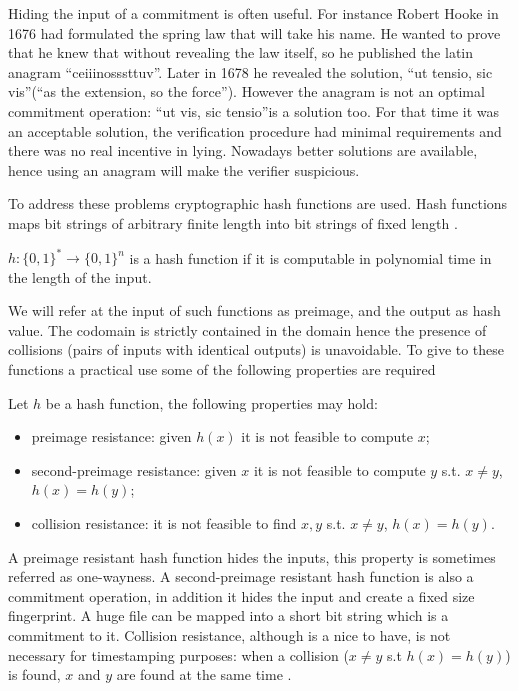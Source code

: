 Hiding the input of a commitment is often useful. For instance Robert Hooke \cite{Petroski96invention} in 1676 had formulated the spring law that will take his name. He wanted to prove that he knew that without revealing the law itself, so he published the latin anagram \textquotedblleft ceiiinosssttuv\textquotedblright. Later in 1678 he revealed the solution, \textquotedblleft ut tensio, sic vis\textquotedblright (\textquotedblleft as the extension, so the force\textquotedblright). However the anagram is not an optimal commitment operation: \textquotedblleft ut vis, sic tensio\textquotedblright is a solution too. For that time it was an acceptable solution, the verification procedure had minimal requirements and there was no real incentive in lying. Nowadays better solutions are available, hence using an anagram will make the verifier suspicious.

To address these problems cryptographic hash functions are used. Hash functions maps bit strings of arbitrary finite length into bit strings of fixed length \cite{Damgard:1989:DPH:118209.118248}. 
\begin{mydef}
	$h : \{ 0, 1 \} ^* \rightarrow \{ 0, 1 \} ^n $ is a hash function if it is computable in polynomial time in the length of the input.
\end{mydef}
We will refer at the input of such functions as preimage, and the output as hash value. The codomain is strictly contained in the domain hence the presence of collisions (pairs of inputs with identical outputs) is unavoidable. 
To give to these functions a practical use some of the following properties are required
\begin{mydef}
	\label{hash-prop}
	Let $h$ be a hash function, the following properties may hold:
	\begin{itemize}
		\item preimage resistance: given $h(x)$ it is not feasible to compute $x$;
		\item second-preimage resistance: given $x$ it is not feasible to compute $y$ s.t. $x \neq y$, $h(x)=h(y)$;
		\item collision resistance: it is not feasible to find $x, y$ s.t. $x \neq y$, $h(x)=h(y)$.
	\end{itemize}
\end{mydef}

A preimage resistant hash function hides the inputs, this property is sometimes referred as one-wayness.
A second-preimage resistant hash function is also a commitment operation, in addition it hides the input and create a fixed size fingerprint. A huge file can be mapped into a short bit string which is a commitment to it.
Collision resistance, although is a nice to have, is not necessary for timestamping purposes: when a collision ($x \neq y$ s.t $h(x)=h(y)$) is found, $x$ and $y$ are found at the same time \cite{SHA1}.

